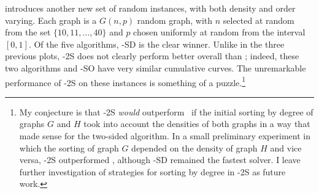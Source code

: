  introduces another new set of random
instances, with both density and order varying.  Each graph is a $G(n,p)$
random graph, with $n$ selected at random from the set $\{10, 11, \dots, 40\}$
and $p$ chosen uniformly at random from the interval $[0,1]$.  Of the five
algorithms, \McSplit-SD is the clear winner.  Unlike in the three previous
plots, \McSplit-2S does not clearly perform better overall than \McSplit;
indeed, these two algorithms and \McSplit-SO have very similar cumulative
curves.  The unremarkable performance of \McSplit-2S on these instances is
something of a puzzle.\footnote{My conjecture is that \McSplit-2S \emph{would}
outperform \McSplit\ if the initial sorting by degree of graphs $G$ and $H$
took into account the densities of both graphs in a way that made sense for the
two-sided algorithm. In a small preliminary experiment in which the sorting of
graph $G$ depended on the density of graph $H$ and vice versa, \McSplit-2S
outperformed \McSplit, although \McSplit-SD remained the fastest solver.
I leave further investigation of strategies for sorting by degree in \McSplit-2S
as future work.} 


